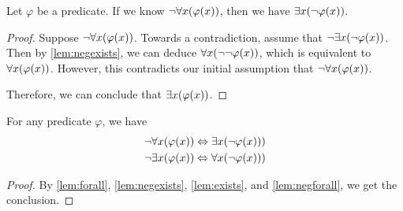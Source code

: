 \begin{lemma}\label{lem:negforall}
    Let \(\varphi\) be a predicate.
    If we know \(\neg \forall x \pn*{\varphi(x)}\), then we have \(\exists x \pn*{\neg \varphi(x)}\).
\end{lemma}
\begin{proof}
    Suppose \(\neg \forall x \pn*{\varphi(x)}\).
    Towards a contradiction, assume that \(\neg \exists x \pn*{\neg \varphi(x)}\).
    Then by \autoref{lem:negexists}, we can deduce \(\forall x \pn*{\neg \neg \varphi(x)}\),
    which is equivalent to \(\forall x \pn*{\varphi(x)}\).
    However, this contradicts our initial assumption that \(\neg \forall x \pn*{\varphi(x)}\). \contradiction

    Therefore, we can conclude that \(\exists x \pn*{\varphi(x)}\).
\end{proof}

\begin{theorem}
    For any predicate \(\varphi\), we have
    \begin{align*}
        \neg \forall x \pn*{\varphi(x)} &\iff \exists x \pn*{\neg \varphi(x))}\\
        \neg \exists x \pn*{\varphi(x)} &\iff \forall x \pn*{\neg \varphi(x))}\\
    \end{align*}
\end{theorem}
\begin{proof}
    By \autoref{lem:forall}, \autoref{lem:negexists}, \autoref{lem:exists}, and \autoref{lem:negforall},
    we get the conclusion.
\end{proof}


